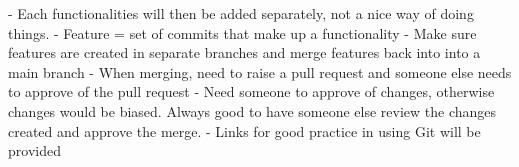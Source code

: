 \documentclass{article}
\begin{document}
- Each functionalities will then be added separately, not a nice way of doing things.\newline\newline
- Feature = set of commits that make up a functionality\newline\newline
- Make sure features are created in separate branches and merge features back into into a main branch\newline\newline
- When merging, need to raise a pull request and someone else needs to approve of the pull request\newline\newline
- Need someone to approve of changes, otherwise changes would be biased. Always good to have someone else review the changes created and approve the merge.\newline\newline
- Links for good practice in using Git will be provided\newline\newline
\end{document}
